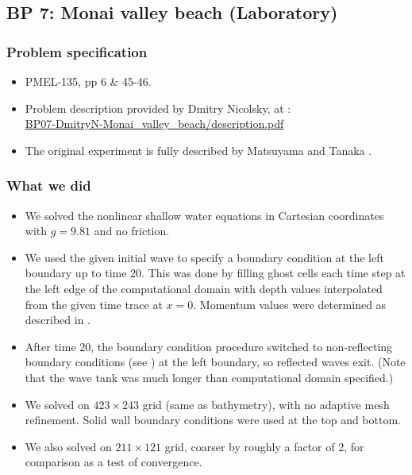 
\subsection{BP 7:
 Monai valley beach (Laboratory)}

\subsubsection{Problem specification}

\begin{itemize}

\item PMEL-135, pp 6 \& 45-46.

\item Problem description provided by Dmitry Nicolsky, 
at \cite{bp-description}: \\
\href{https://github.com/rjleveque/nthmp-benchmark-problems/blob/master/BP07-DmitryN-Monai_valley_beach/description.pdf}{BP07-DmitryN-Monai\_valley\_beach/description.pdf}

\item The original experiment is fully described by Matsuyama and Tanaka
\cite{MatsuyamaTanaka:monai}.

\end{itemize} 

\subsubsection{What we did}

\begin{itemize}
\item We solved the nonlinear shallow water equations in Cartesian
coordinates with $g=9.81$ and no friction.  
\item We used the given initial wave to specify a boundary condition at the left
boundary up to time 20.  This was done by filling ghost cells each time step
at the left edge of the computational domain with depth values interpolated
from the given time trace at $x=0$.  Momentum values were determined as
described in .

\item After time 20, the boundary condition procedure
switched to non-reflecting boundary conditions (see )
at the left boundary, so reflected waves exit.  
(Note that the wave tank was much longer than computational domain specified.)
\item We solved on $423\times 243$ grid (same as bathymetry), with no
adaptive mesh refinement.
Solid wall boundary conditions were used at the top and bottom.
\item We also solved on $211\times 121$ grid, coarser by roughly a factor of
2, for comparison as a test of convergence.
\end{itemize} 

